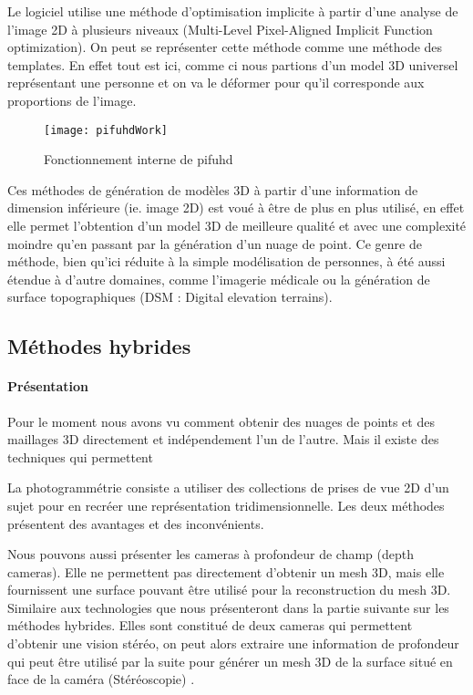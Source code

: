 Le logiciel utilise une méthode d'optimisation implicite à partir d'une analyse de l'image 2D à plusieurs niveaux (Multi-Level Pixel-Aligned Implicit Function optimization). On peut se représenter cette méthode comme une méthode des templates. En effet tout est ici, comme ci nous partions d'un model 3D universel représentant une personne et on va le déformer pour qu'il corresponde aux proportions de l'image.

\begin{figure}[h]
    \centering
    \texttt{[image: pifuhdWork]}
    \caption{Fonctionnement interne de pifuhd}
    \label{fig:pifuhdWork}
\end{figure}
\FloatBarrier

Ces méthodes de génération de modèles 3D à partir d'une information de dimension inférieure (ie. image 2D) est voué à être de plus en plus utilisé, en effet elle permet l'obtention d'un model 3D de meilleure qualité et avec une complexité moindre qu'en passant par la génération d'un nuage de point. Ce genre de méthode, bien qu'ici réduite à la simple modélisation de personnes, à été aussi étendue à d'autre domaines, comme l'imagerie médicale ou la génération de surface topographiques (DSM : Digital elevation terrains)\cite{DSM}.


\subsection{Méthodes hybrides}

\paragraph{Présentation} Pour le moment nous avons vu comment obtenir des nuages de points et des maillages 3D directement et indépendement l'un de l'autre. Mais il existe des techniques qui permettent




La photogrammétrie  consiste a utiliser des collections de prises de vue 2D d'un sujet pour en recréer une représentation tridimensionnelle.
Les deux méthodes présentent des avantages et des inconvénients.


Nous pouvons aussi présenter les cameras à profondeur de champ (depth cameras). Elle ne permettent pas directement d'obtenir un mesh 3D, mais elle fournissent une surface pouvant être utilisé pour la reconstruction du mesh 3D. Similaire aux technologies que nous présenteront dans la partie suivante sur les méthodes hybrides.
\newline
Elles sont constitué de deux cameras qui permettent d'obtenir une vision stéréo, on peut alors extraire une information de profondeur qui peut être utilisé par la suite pour générer un mesh 3D de la surface situé en face de la caméra (Stéréoscopie) \cite{book1}.

